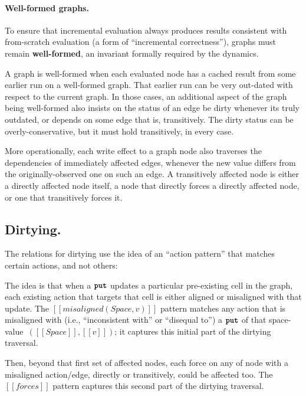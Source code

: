 \documentclass[11pt]{article}
\renewcommand{\ottkw}[1]{\textbf{\texttt{#1}}}
\begin{document}
\ottgrammartabular{
  \ottedge
  \\
  \ottA
  \\
  \ottb
}


\paragraph{Well-formed graphs.}
To ensure that incremental evaluation always produces results
consistent with from-scratch evaluation (a form of ``incremental
correctness''), graphs must remain \textbf{well-formed}, an invariant
formally required by the dynamics.

A graph is well-formed when each evaluated node has a cached result
from some earlier run on a well-formed graph.
%
That earlier run can be very out-dated with respect to the current graph.
%
In those cases, an additional aspect of the graph being well-formed
also insists on the status of an edge be dirty whenever its truly
outdated, or depends on some edge that is, transitively.
%
The dirty status can be overly-conservative, but it must hold
transitively, in every case.

More operationally, each write effect to a graph node also traverses
the dependencies of immediately affected edges, whenever the new value
differs from the originally-observed one on such an edge.
%
A transitively affected node is either a directly affected node
itself, a node that directly forces a directly affected node, or one
that transitively forces it.

\subsection{Dirtying.}

The relations for dirtying use the idea of an ``action pattern'' that
matches certain actions, and not others:

\ottgrammartabular{
  \ottDirtyActionPattern
}

The idea is that when a $\ottkw{put}$ updates a particular pre-existing cell in the graph,
each existing action that targets that cell is either aligned or misaligned with that update.
%
The $[[misaligned(Space,v)]]$ pattern matches any action that is
misaligned with (i.e., ``inconsistent with'' or ``disequal to'') a
$\ottkw{put}$ of that space-value~$([[Space]],[[v]])$; it captures this
initial part of the dirtying traversal.

Then, beyond that first set of affected nodes, each force on any of
node with a misaligned action/edge, directly or transitively, could be
affected too.
%
The $[[forces]]$ pattern captures this second part of the dirtying
traversal.
\end{document}
